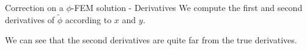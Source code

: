 \documentclass[compress,10pt,xcolor={table,dvipsnames},t]{beamer}
\begin{document}
	\begin{frame}{Correction on a $\phi$-FEM solution - Derivatives}
		We compute the first and second derivatives of $\tilde{\phi}$ according to $x$ and $y$.
		\begin{center}
		\end{center}
		We can see that the second derivatives are quite far from the true derivatives.
	\end{frame}
	
\end{document}
